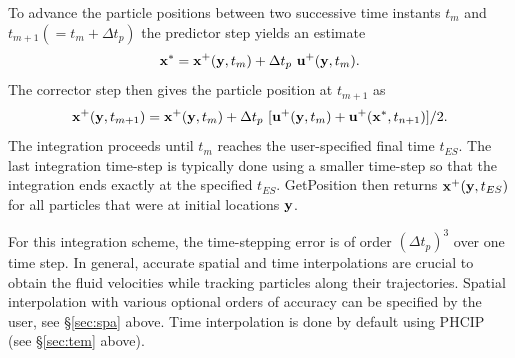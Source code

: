 \documentclass[11pt]{article}
\begin{document}
To advance the particle positions between two successive time instants $t_m$ and $t_{m+1}(=t_m+\Delta t_p)$   the predictor step yields an estimate
\begin{equation}
{\bf x}^*={\bf x}^+({\bf y},t_m) + \Delta t_p ~{\bf u}^+({\bf y},t_m).
\label{eq:pre_position}
\end{equation}
The corrector step then gives the particle position at $t_{m+1}$ as
\begin{equation}
{\bf x}^+({\bf y},t_{m+1})={\bf x}^+({\bf y},t_m)+\Delta t_p ~[{\bf u}^+({\bf y},t_m)+{\bf u}^+({\bf x}^*,t_{n+1})]/2.
\label{eq:position}
\end{equation}
The integration proceeds until $t_m$ reaches the user-specified final time $t_{ES}$. The last integration time-step is typically done using a smaller time-step so that the integration ends exactly at the specified $t_{ES}$. GetPosition then returns ${\bf x}^+({\bf y},t_{ES})$ for all particles that were at initial locations ${\bf y}$.

For this integration scheme, the time-stepping error is of order $(\Delta t_p)^3$ over one time step. In general, accurate spatial and time interpolations are crucial to obtain the fluid velocities while tracking particles along their trajectories. Spatial interpolation with various optional orders of accuracy can be specified by the user, see \S\ref{sec:spa}  above. Time interpolation is done by default using PHCIP (see \S\ref{sec:tem} above).



\end{document}
